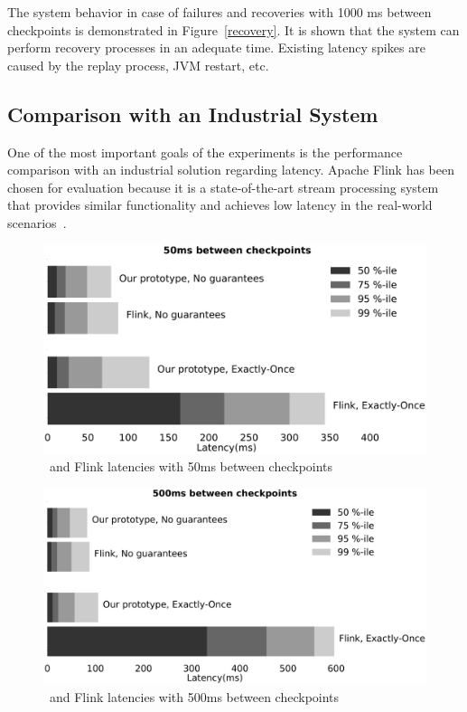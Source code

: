 The system behavior in case of failures and recoveries with 1000 ms between checkpoints is demonstrated in Figure~\ref{recovery}. It is shown that the system can perform recovery processes in an adequate time. Existing latency spikes are caused by the replay process, JVM restart, etc.

\subsection{Comparison with an Industrial System}
One of the most important goals of the experiments is the performance comparison with an industrial solution regarding latency. Apache Flink has been chosen for evaluation because it is a state-of-the-art stream processing system that provides similar functionality and achieves low latency in the real-world scenarios~\cite{S7530084}. 

\begin{figure}[t]
  \centering
  \includegraphics[width=.8\textwidth]{Chapters/DeterministicModelRuntime/pics/comparison50}
  \caption{\FlameStream\ and Flink latencies with 50ms between checkpoints}
  \label{comparison50}
\end{figure}

\begin{figure}[t]
  \centering
  \includegraphics[width=.8\textwidth]{Chapters/DeterministicModelRuntime/pics/comparison500}
  \caption{\FlameStream\ and Flink latencies with 500ms between checkpoints}
  \label{comparison500}
\end{figure}

